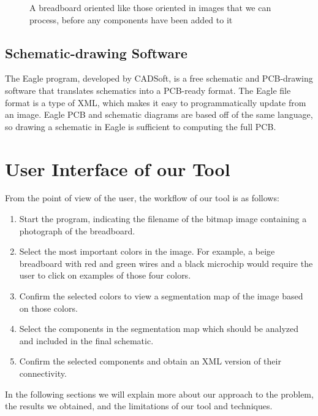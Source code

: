 \documentclass[10pt,twocolumn,letterpaper]{article}
\begin{document}
\begin{figure}[t]
\begin{center}
\end{center}
   \caption{A breadboard oriented like those oriented in images that
     we can process, before any components have been added to it}
\label{fig:board}
\end{figure}


\subsection{Schematic-drawing Software}

The Eagle program, developed by CADSoft, is a free schematic and PCB-drawing
software that translates schematics into a PCB-ready format. The Eagle file
format is a type of XML, which makes it easy to programmatically update from an
image. Eagle PCB and schematic diagrams are based off of the same language, so
drawing a schematic in Eagle is sufficient to computing the full PCB. 


\section{User Interface of our Tool}

From the point of view of the user, the workflow of our tool is as
follows:

\begin{enumerate}
\item Start the program, indicating the filename of the bitmap image
  containing a photograph of the breadboard.
\item Select the most important colors in the image. For example, a
  beige breadboard with red and green wires and a black microchip
  would require the user to click on examples of those four colors.
\item Confirm the selected colors to view a segmentation map of the image
  based on those colors.
\item Select the components in the segmentation map which should be
  analyzed and included in the final schematic.
\item Confirm the selected components and obtain an XML version of
  their connectivity.
\end{enumerate}

In the following sections we will explain more about our approach to
the problem, the results we obtained, and the limitations of our tool
and techniques.
\end{document}
